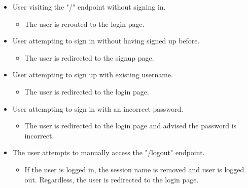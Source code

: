 \documentclass[12pt]{article}
\begin{document}
\begin{itemize}
    \item User visiting the "/" endpoint without signing in.
    \begin{itemize}
        \item The user is rerouted to the login page.
    \end{itemize}
    \item User attempting to sign in without having signed up before.
    \begin{itemize}
        \item The user is redirected to the signup page.
    \end{itemize}
    \item User attempting to sign up with existing username.
    \begin{itemize}
        \item The user is redirected to the login page.
    \end{itemize}
    \item User attempting to sign in with an incorrect password.
    \begin{itemize}
        \item The user is redirected to the login page and advised the password is incorrect.
    \end{itemize}
    \item The user attempts to manually access the "/logout" endpoint.
    \begin{itemize}
        \item If the user is logged in, the session name is removed and user is logged out. Regardless, the user is redirected to the login page.
    \end{itemize}
\end{itemize}\\\\
\end{document}
